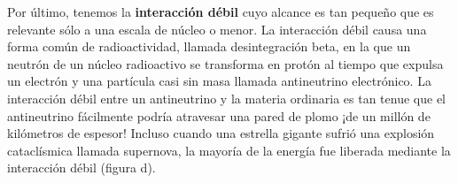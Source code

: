 \documentclass{article}
\newcommand{\bl}[1]{\textbf{#1}}
\begin{document}
\begin{multicols}{2}
\begin{minipage}{0.6\textwidth}
            \vspace{0.2cm}

            \par Por último, tenemos la \bl{interacción débil} cuyo alcance es tan pequeño que es relevante sólo a una escala de núcleo o menor. La interacción débil causa una forma común de radioactividad, llamada desintegración beta, en la que un neutrón de un núcleo radioactivo se transforma en protón al tiempo que expulsa un electrón y una partícula casi sin masa llamada antineutrino electrónico. La interacción débil entre un antineutrino y la materia ordinaria es tan tenue que el antineutrino fácilmente podría atravesar una pared de plomo ¡de un millón de kilómetros de espesor! Incluso cuando una estrella gigante sufrió una explosión cataclísmica llamada supernova, la mayoría de la energía fue liberada mediante la interacción débil (figura d).

        \end{minipage}

        \columnbreak


\end{multicols}
\end{document}
